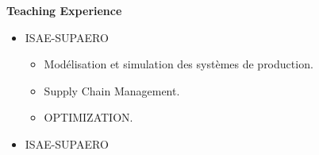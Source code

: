 \textbf{Teaching Experience}

    \begin{itemize}
        \item ISAE-SUPAERO
        \begin{itemize}
            \item Modélisation et simulation des systèmes de production.
            \item Supply Chain Management.
            \item OPTIMIZATION.
        \end{itemize}
        \item ISAE-SUPAERO
    \end{itemize}